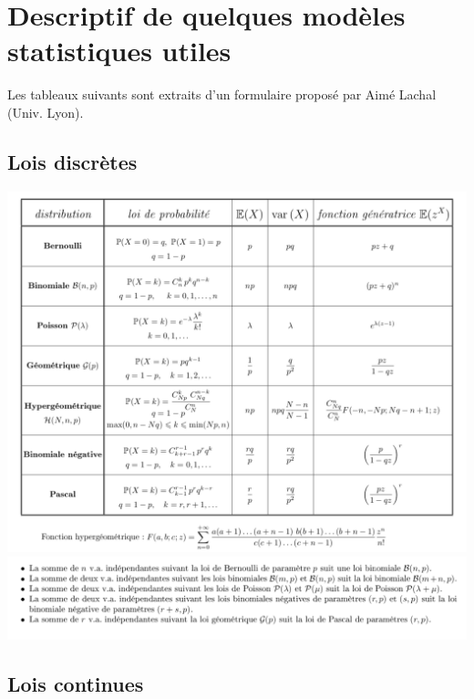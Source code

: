 \section{Descriptif de quelques modèles statistiques utiles}\label{annexe:modeles}

Les tableaux suivants sont extraits d'un formulaire proposé par Aimé Lachal (Univ. Lyon). 

\subsection{Lois discrètes}

\begin{center}
    \includegraphics[scale=0.4]{figures/discretes1.png}
     \includegraphics[scale=0.4]{figures/discretes2.png}
\end{center}

\subsection{Lois continues}

